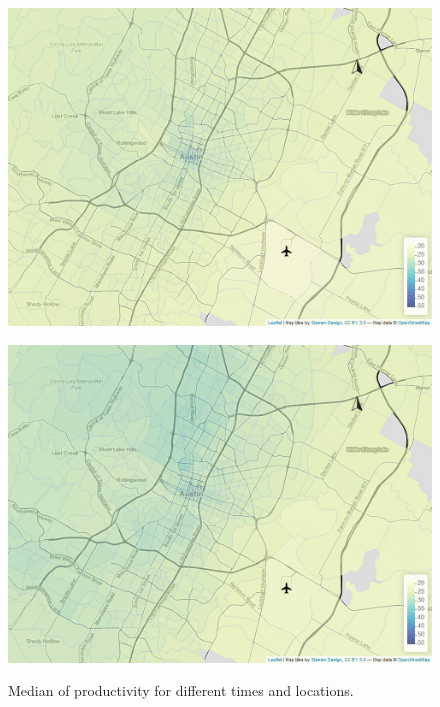 \begin{figure}[htb]
\begin{minipage}[t]{.48\linewidth}
        \centering
        \includegraphics[width=\linewidth]{img/quantile_142_5.png}
        \label{fig:quantiles:0.5:c}
    \end{minipage}
    \begin{minipage}[t]{0.48\linewidth}
        \centering
        \includegraphics[width=\linewidth]{img/quantile_168_5.png}
        \label{fig:quantiles:0.5:d}
    \end{minipage}
    \caption{Median of productivity for different times and locations.}
    \label{fig:quantiles:0.5}
\end{figure}